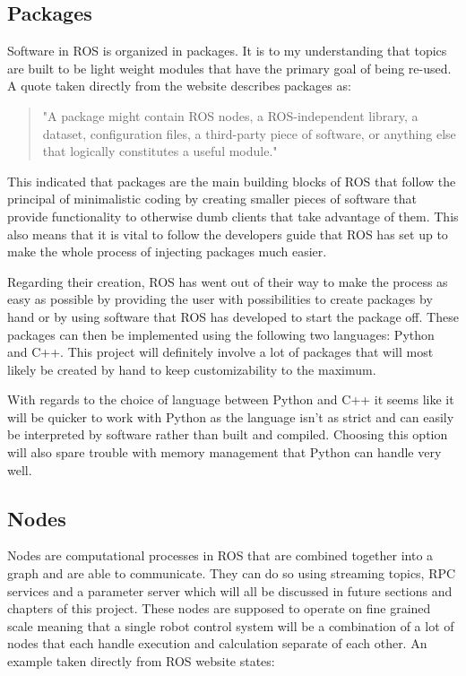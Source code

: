 \documentclass{report}
\begin{document}
      \subsection{Packages}

      Software in ROS is organized in packages. It is to my understanding that topics are built to be light weight modules that have the primary goal of being re-used. A quote taken directly from the website describes packages as:
      
      \begin{quote} "A package might contain ROS nodes, a ROS-independent library, a dataset, configuration files, a third-party piece of software, or anything else that logically constitutes a useful module." \end{quote}
      
      This indicated that packages are the main building blocks of ROS that follow the principal of minimalistic coding by creating smaller pieces of software that provide functionality to otherwise dumb clients that take advantage of them. This also means that it is vital to follow the developers guide that ROS has set up to make the whole process of injecting packages much easier.

      Regarding their creation, ROS has went out of their way to make the process as easy as possible by providing the user with possibilities to create packages by hand or by using software that ROS has developed to start the package off. These packages can then be implemented using the following two languages: Python and C++. This project will definitely involve a lot of packages that will most likely be created by hand to keep customizability to the maximum.

      With regards to the choice of language between Python and C++ it seems like it will be quicker to work with Python as the language isn't as strict and can easily be interpreted by software rather than built and compiled. Choosing this option will also spare trouble with memory management that Python can handle very well.

      \subsection{Nodes}

      Nodes are computational processes in ROS that are combined together into a graph and are able to communicate. They can do so using streaming topics, RPC services and a parameter server which will all be discussed in future sections and chapters of this project. These nodes are supposed to operate on fine grained scale meaning that a single robot control system will be a combination of a lot of nodes that each handle execution and calculation separate of each other. An example taken directly from ROS website states: 
\end{document}
